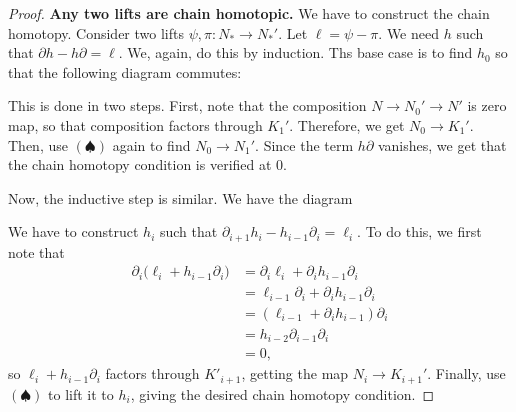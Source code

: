 \begin{proof}
    \textbf{Any two lifts are chain homotopic.}
    We have to construct the chain homotopy.
    Consider two lifts $\psi, \pi : N_*\to N_*'$.
    Let $\ell = \psi-\pi$.
    We need $h$ such that $\partial h - h\partial = \ell$.
    We, again, do this by induction. 
    Ths base case is to find $h_0$ so that the 
    following diagram commutes:
    \begin{center}
    \end{center}
    This is done in two steps.
    First, note that the composition 
    $N\to N_0'\to N'$ is zero map,
    so that composition factors through $K_1'$.
    Therefore, we get $N_0\to K_1'$.
    Then, use $(\spadesuit)$ again to find $N_0\to N_1'$.
    Since the term $h\partial$ vanishes,
    we get that the chain homotopy condition
    is verified at $0$.

    Now, the inductive step is similar. We have the diagram
    \begin{center}
    \end{center}
    We have to construct $h_i$ such that
    $\partial_{i+1}h_i - h_{i-1}\partial_i = \ell_i$.
    To do this, we first note that
    \begin{align*}
    \partial_i\Big(\ell_i + h_{i-1}\partial_i\Big)
    &= \partial_i\ell_i + \partial_i h_{i-1}\partial_i \\
    &= \ell_{i-1}\partial_i + \partial_ih_{i-1}\partial_i 
    \tag{$\ell$ commutes with boundary maps}\\
    &= (\ell_{i-1} + \partial_{i}h_{i-1})\partial_i \\
    &= h_{i-2}\partial_{i-1}\partial_i 
    \tag{chain homotopy definition}\\
    &= 0,
    \end{align*}
    so $\ell_i + h_{i-1}\partial_i$ factors through
    $K'_{i+1}$, getting the map 
    $N_i\to K_{i+1}'$. Finally, use $(\spadesuit)$
    to lift it to $h_i$, giving the desired
    chain homotopy condition.
\end{proof}
